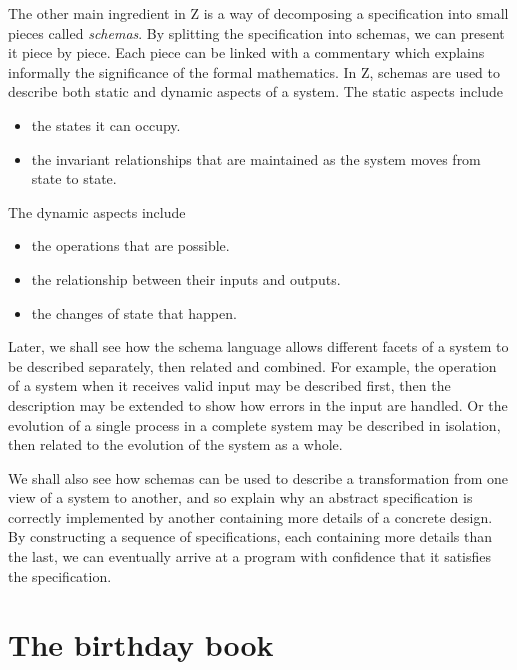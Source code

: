 \documentclass[12pt]{article}
\begin{document}
The other main ingredient in Z is a way of decomposing
a specification into small pieces called {\em schemas}. By
splitting the specification into schemas, we can present
it piece by piece. Each piece can be linked with a
commentary which explains informally the significance of the
formal mathematics.
In Z, schemas are used to describe both
static and dynamic aspects of a system. The static aspects
include 
\begin{itemize}
\item	the states it can occupy.
\item	the invariant relationships that are maintained
	as the system moves from state to state.
\end{itemize}
The dynamic aspects include
\begin{itemize}
\item	the operations that are possible.
\item	the relationship between their inputs and outputs.
\item	the changes of state that happen.
\end{itemize}
Later, we shall see how the schema language allows different
facets of a system to be described separately, then related
and combined. For example, the operation of a system when it
receives valid input may be described first, then the
description may be extended to show how errors in the input
are handled. Or the evolution of a single process in a
complete system may be described in isolation, then related
to the evolution of the system as a whole.

We shall also see how schemas can be used to describe a
transformation from one view of a system to another, and so
explain why an abstract specification is correctly
implemented by another containing more details of a concrete
design. By constructing a sequence of specifications, each
containing more details than the last, we can eventually
arrive at a program with confidence that it satisfies the
specification.

\section{The birthday book}\label{bb}
\end{document}

